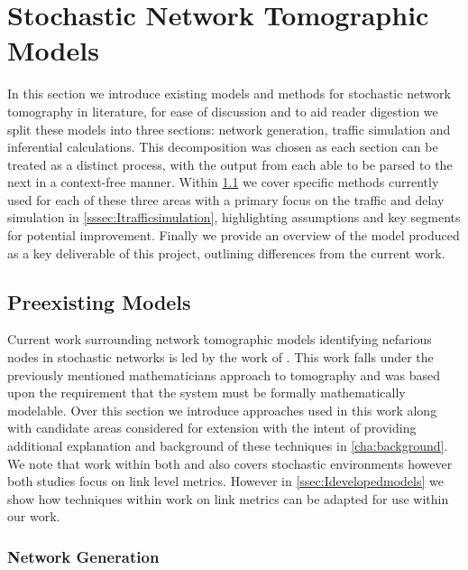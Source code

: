 \newpage

\section{Stochastic Network Tomographic Models}
\label{sec:Imodels}

In this section we introduce existing models and methods for stochastic network tomography in literature, for ease of discussion and to aid reader digestion we split these models into three sections: network generation, traffic simulation and inferential calculations. This decomposition was chosen as each section can be treated as a distinct process, with the output from each able to be parsed to the next in a context-free manner. Within \cref{ssec:Icurrentmodels} we cover specific methods currently used for each of these three areas with a primary focus on the traffic and delay simulation in \cref{sssec:Itrafficsimulation}, highlighting assumptions and key segments for potential improvement. Finally we provide an overview of the model produced as a key deliverable of this project, outlining differences from the current work.

\subsection{Preexisting Models}
\label{ssec:Icurrentmodels}

Current work surrounding network tomographic models identifying nefarious nodes in stochastic networks is led by the work of \cite{barnes_stochastic_2020}. This work falls under the previously mentioned mathematicians approach to tomography and was based upon the requirement that the system must be formally mathematically modelable. Over this section we introduce approaches used in this work along with candidate areas considered for extension with the intent of providing additional explanation and background of these techniques in \cref{cha:background}. We note that work within both \cite{he_fisher_2015} and \cite{kolar_distributed_2020} also covers stochastic environments however both studies focus on link level metrics. However in \cref{ssec:Idevelopedmodels} we show how techniques within work on link metrics can be adapted for use within our work.

\subsubsection*{Network Generation}
\label{sssec:Inetworkgeneration}

